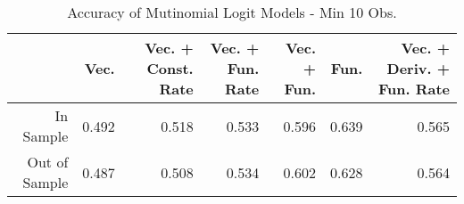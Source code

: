 \begin{table}[ht]
\centering
\begin{tabular}{rrrrrrr}
  \hline
 & Vec. & Vec. + Const. Rate & Vec. + Fun. Rate & Vec. + Fun. & Fun. & Vec. + Deriv. + Fun. Rate \\ 
  \hline
In Sample & 0.492 & 0.518 & 0.533 & 0.596 & 0.639 & 0.565 \\ 
  Out of Sample & 0.487 & 0.508 & 0.534 & 0.602 & 0.628 & 0.564 \\ 
   \hline
\end{tabular}
\caption{Accuracy of Mutinomial Logit Models - Min 10 Obs.} 
\label{multi_10obs_acc}
\end{table}
